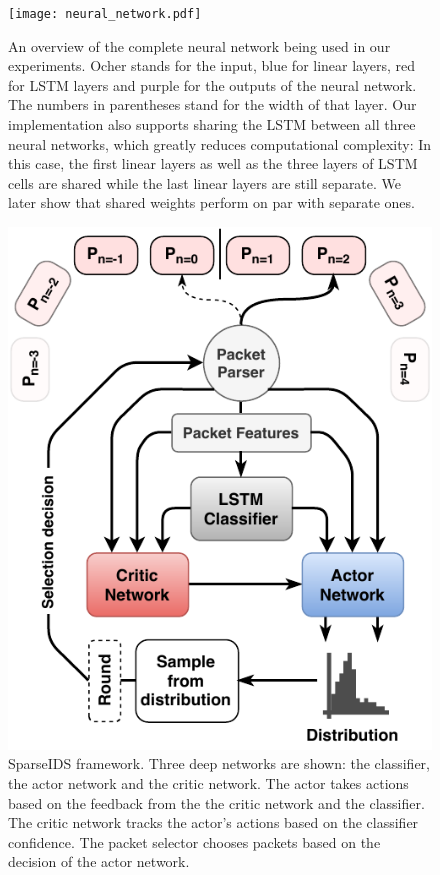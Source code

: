 \documentclass[conference]{IEEEtran}
\newcommand\note[2]{{\color{#1}#2}}
\begin{document}
\begin{figure}[h]
\centering
  \texttt{[image: neural\_network.pdf]}
  \caption{An overview of the complete neural network being used in our experiments. Ocher stands for the input, blue for linear layers, red for LSTM layers and purple for the outputs of the neural network. The numbers in parentheses stand for the width of that layer. Our implementation also supports sharing the LSTM between all three neural networks, which greatly reduces computational complexity: In this case, the first linear layers as well as the three layers of LSTM cells are shared while the last linear layers are still separate. We later show that shared weights perform on par with separate ones.}
  \label{fig:neuralNetworkArchitecture}
\end{figure}


\begin{figure}[h]
\centering
  \includegraphics[width=0.8\columnwidth]{img/rnn-sampling.pdf}
  \caption{SparseIDS framework. Three deep networks are shown: the classifier, the actor network and the critic network. The actor takes actions based on the feedback from the the critic network and the classifier. The critic network tracks the actor's actions based on the classifier confidence. The packet selector chooses packets based on the decision of the actor network.}
  \label{fig:sampling}
\end{figure}
\end{document}
